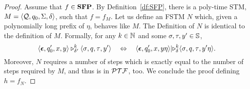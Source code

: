 \begin{proof}
Assume that $f \in \mathbf{SFP}$.
%
By Definition~\ref{df:SFP},
there is a poly-time STM, $M =\langle \textcolor{black}{\mathcal{Q}},
\textcolor{black}{q_0}, \textcolor{black}{\Sigma}, \textcolor{black}{\delta}\rangle$,
such that $f=f_M$.
%
Let us define an FSTM $N$
which, given a polynomially long prefix of $\eta$,
behaves like $M$.
%
The Definition of $N$ is identical to the definition of $M$.
Formally,
for any $k\in \mathbb{N}$ and some $\sigma,\tau , y' \in \mathbb{S}$,
$$
\langle \textcolor{black}{\bm{\epsilon}}, \textcolor{black}{q_0'}, \textcolor{black}{x}, \textcolor{black}{y} \rangle
\triangleright^k_{\delta'} \langle \textcolor{black}{\sigma},
\textcolor{black}{q}, \textcolor{black}{\tau}, \textcolor{black}{y'}\rangle
\ \ \ \Leftrightarrow \ \ \
\langle \bm{\epsilon}, q_0', x, y\eta\rangle
\lvert\triangleright^k_\delta
\langle \textcolor{black}{\sigma}, \textcolor{black}{q}, \textcolor{black}{\tau}, \textcolor{black}{y'\eta}\rangle.
$$
Moreover,
$N$ requires a number of steps which is exactly equal to
the number of steps required by $M$, and thus
is in $\mathcal{PTF}$, too.
%
We conclude the proof defining $h=f_{N}$.
\end{proof}













































































